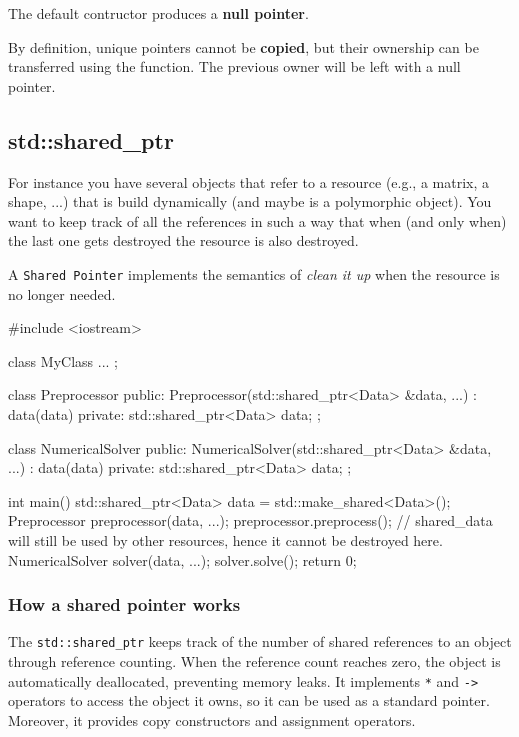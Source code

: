 The default contructor produces a \textbf{null pointer}. 

\begin{warningblock}[Copying]
    By definition, unique pointers cannot be \textbf{copied}, but their ownership can be transferred using the  function. The previous owner will be left with a null pointer.
\end{warningblock}

\subsection{std::shared\_ptr}

For instance you have several objects that refer to a resource (e.g., a matrix, a shape, ...) that is
build dynamically (and maybe is a polymorphic object). You want to keep track of all the
references in such a way that when (and only when) the last one gets destroyed the resource is
also destroyed.

A \texttt{Shared Pointer} implements the semantics of \textit{clean it up} when the resource is no longer needed. 

\begin{exampleblock}
    \begin{codeblock}[language=C++]
#include <iostream>

class MyClass { ... };

class Preprocessor {
public: 
    Preprocessor(std::shared_ptr<Data> &data, ...) : data(data) {}
private:
    std::shared_ptr<Data> data;
};

class NumericalSolver {
public:
    NumericalSolver(std::shared_ptr<Data> &data, ...) : data(data) {}
private:
    std::shared_ptr<Data> data;
};

int main() {
    std::shared_ptr<Data> data = std::make_shared<Data>();
    Preprocessor preprocessor(data, ...);
    preprocessor.preprocess();
    // shared\_data will still be used by other resources, hence it cannot be destroyed here.
    NumericalSolver solver(data, ...);
    solver.solve();
    return 0;
}
    \end{codeblock}
\end{exampleblock}

\subsubsection*{How a shared pointer works}
The \texttt{std::shared\_ptr} keeps track of the number of shared references to an object through reference counting. 
When the reference count
reaches zero, the object is automatically deallocated, preventing memory leaks.
It implements \texttt{*} and \texttt{->} operators to access the object it owns, so it can be used as a standard pointer.
Moreover, it provides copy constructors and assignment operators.


